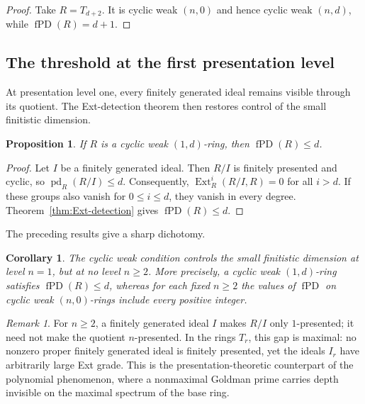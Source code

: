 \documentclass[11pt]{amsart}
\numberwithin{equation}{section}
\newtheorem{proposition}[theorem]{Proposition}
\newtheorem{corollary}[theorem]{Corollary}
\theoremstyle{definition}
\theoremstyle{remark}
\newtheorem{remark}[theorem]{Remark}
\newcommand{\fPD}{\operatorname{fPD}}
\newcommand{\pd}{\operatorname{pd}}
\newcommand{\Ext}{\operatorname{Ext}}
\begin{document}
\begin{proof}
Take $R=T_{d+2}$.  It is cyclic weak $(n,0)$ and hence cyclic weak $(n,d)$, while $\fPD(R)=d+1$.
\end{proof}

\subsection{The threshold at the first presentation level}

At presentation level one, every finitely generated ideal remains visible through its quotient.  The Ext-detection theorem then restores control of the small finitistic dimension.

\begin{proposition}\label{prop:level-one}\cite[Proposition 3.7]{ZhangIII}
If $R$ is a cyclic weak $(1,d)$-ring, then $\fPD(R)\leq d$.
\end{proposition}

\begin{proof}
Let $I$ be a finitely generated ideal.  Then $R/I$ is finitely presented and cyclic, so $\pd_R(R/I)\leq d$.  Consequently, $\Ext_R^i(R/I,R)=0$ for all $i>d$.  If these groups also vanish for $0\leq i\leq d$, they vanish in every degree.  Theorem~\ref{thm:Ext-detection} gives $\fPD(R)\leq d$.
\end{proof}

The preceding results give a sharp dichotomy.

\begin{corollary}\label{cor:sharp-threshold}
The cyclic weak condition controls the small finitistic dimension at level $n=1$, but at no level $n\geq2$.  More precisely, a cyclic weak $(1,d)$-ring satisfies $\fPD(R)\leq d$, whereas for each fixed $n\geq2$ the values of $\fPD$ on cyclic weak $(n,0)$-rings include every positive integer.
\end{corollary}

\begin{remark}\label{rem:visibility-summary}
For $n\geq2$, a finitely generated ideal $I$ makes $R/I$ only $1$-presented; it need not make the quotient $n$-presented.  In the rings $T_r$, this gap is maximal: no nonzero proper finitely generated ideal is finitely presented, yet the ideals $I_r$ have arbitrarily large Ext grade.  This is the presentation-theoretic counterpart of the polynomial phenomenon, where a nonmaximal Goldman prime carries depth invisible on the maximal spectrum of the base ring.
\end{remark}
\end{document}
